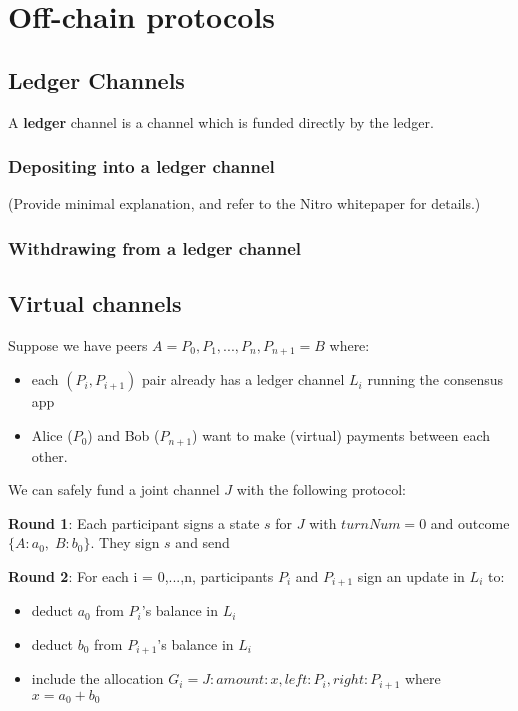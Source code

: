 \section{Off-chain protocols}
\subsection{Ledger Channels}

A \textbf{ledger} channel is a channel which is funded directly by the ledger.

\subsubsection{Depositing into a ledger channel}
(Provide minimal explanation, and refer to the Nitro whitepaper for details.)

\subsubsection{Withdrawing from a ledger channel}

\subsection{Virtual channels}
Suppose we have peers $A = P_0, P_1, ..., P_n, P_{n+1} = B$ where:
\begin{itemize}
    \item each $(P_i, P_{i+1})$ pair already has a ledger channel $L_i$ running the consensus app
    \item Alice ($P_0$) and Bob ($P_{n+1}$) want to make (virtual) payments between each other.
\end{itemize}

We can safely fund a joint channel $J$ with the following protocol:

\textbf{Round 1}: Each participant signs a state $s$ for $J$ with $turnNum = 0$ and outcome $\{A: a_0,\; B: b_0\}$. They sign $s$ and send 

\textbf{Round 2}: For each i = 0,...,n, participants $P_i$ and $P_{i+1}$ sign an update in $L_i$ to:
\begin{itemize}
    \item deduct $a_0$ from $P_i$'s balance in $L_i$
    \item deduct $b_0$ from $P_{i+1}$'s balance in $L_i$
    \item include the allocation $G_i = {J: {amount: x, left: P_i, right: P_{i+1}}}$ where $x=a_0+b_0$
\end{itemize}


